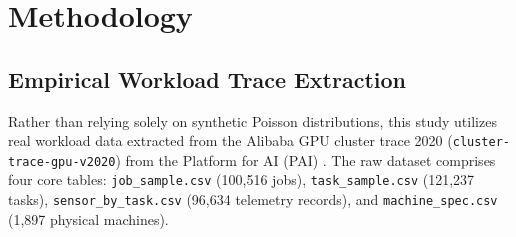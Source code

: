 \documentclass[a4paper,fleqn]{cas-dc}
\begin{document}
\section{Methodology}\label{sec:method}

\subsection{Empirical Workload Trace Extraction}
Rather than relying solely on synthetic Poisson distributions, this study utilizes real workload data extracted from the Alibaba GPU cluster trace 2020 (\texttt{cluster-trace-gpu-v2020}) from the Platform for AI (PAI) \citep{weng2022mlaas,alibaba2020gputrace}. The raw dataset comprises four core tables: \texttt{job\_sample.csv} (100,516 jobs), \texttt{task\_sample.csv} (121,237 tasks), \texttt{sensor\_by_task.csv} (96,634 telemetry records), and \texttt{machine\_spec.csv} (1,897 physical machines).
\end{document}
